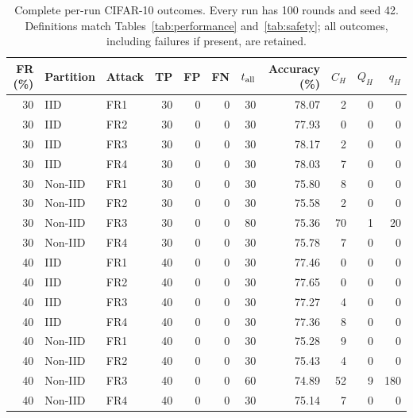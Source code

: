 \begin{table}[t]
\centering\footnotesize\setlength{\tabcolsep}{4pt}
\caption{Complete per-run CIFAR-10 outcomes. Every run has 100 rounds and seed 42. Definitions match Tables~\ref{tab:performance} and~\ref{tab:safety}; all outcomes, including failures if present, are retained.}\label{tab:detail-cifar10}
\begin{tabular}{rllrrrrrrrr}
\toprule
FR (\%) & Partition & Attack & TP & FP & FN & $t_{\rm all}$ & Accuracy (\%) & $C_H$ & $Q_H$ & $q_H$ \\
\midrule
30 & IID & FR1 & 30 & 0 & 0 & 30 & 78.07 & 2 & 0 & 0 \\
30 & IID & FR2 & 30 & 0 & 0 & 30 & 77.93 & 0 & 0 & 0 \\
30 & IID & FR3 & 30 & 0 & 0 & 30 & 78.17 & 2 & 0 & 0 \\
30 & IID & FR4 & 30 & 0 & 0 & 30 & 78.03 & 7 & 0 & 0 \\
30 & Non-IID & FR1 & 30 & 0 & 0 & 30 & 75.80 & 8 & 0 & 0 \\
30 & Non-IID & FR2 & 30 & 0 & 0 & 30 & 75.58 & 2 & 0 & 0 \\
30 & Non-IID & FR3 & 30 & 0 & 0 & 80 & 75.36 & 70 & 1 & 20 \\
30 & Non-IID & FR4 & 30 & 0 & 0 & 30 & 75.78 & 7 & 0 & 0 \\
40 & IID & FR1 & 40 & 0 & 0 & 30 & 77.46 & 0 & 0 & 0 \\
40 & IID & FR2 & 40 & 0 & 0 & 30 & 77.65 & 0 & 0 & 0 \\
40 & IID & FR3 & 40 & 0 & 0 & 30 & 77.27 & 4 & 0 & 0 \\
40 & IID & FR4 & 40 & 0 & 0 & 30 & 77.36 & 8 & 0 & 0 \\
40 & Non-IID & FR1 & 40 & 0 & 0 & 30 & 75.28 & 9 & 0 & 0 \\
40 & Non-IID & FR2 & 40 & 0 & 0 & 30 & 75.43 & 4 & 0 & 0 \\
40 & Non-IID & FR3 & 40 & 0 & 0 & 60 & 74.89 & 52 & 9 & 180 \\
40 & Non-IID & FR4 & 40 & 0 & 0 & 30 & 75.14 & 7 & 0 & 0 \\
\bottomrule
\end{tabular}

\end{table}
